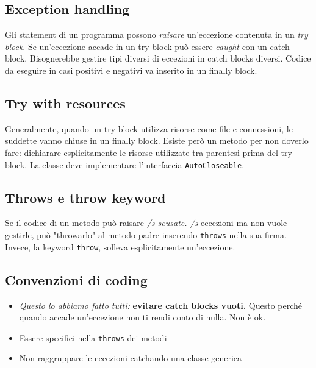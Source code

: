 \documentclass[11pt]{article}
\newcommand{\code}[1]{\texttt{#1}}
\begin{document}
\subsection{Exception handling}
Gli statement di un programma possono \textit{raisare} un'eccezione contenuta in un \textit{try block}. Se un'eccezione accade in un try block può essere \textit{caught} con un catch block. Bisognerebbe gestire tipi diversi di eccezioni in catch blocks diversi. Codice da eseguire in casi positivi e negativi va inserito in un finally block.
\subsection{Try with resources}
Generalmente, quando un try block utilizza risorse come file e connessioni, le suddette vanno chiuse in un finally block. Esiste però un metodo per non doverlo fare: dichiarare esplicitamente le risorse utilizzate tra parentesi prima del try block. La classe deve implementare l'interfaccia \code{AutoCloseable}.
\subsection{Throws e throw keyword}
Se il codice di un metodo può raisare \textit{/s scusate. /s} eccezioni ma non vuole gestirle, può "throwarlo" al metodo padre inserendo \code{throws} nella sua firma. Invece, la keyword \code{throw}, solleva esplicitamente un'eccezione.
\subsection{Convenzioni di coding}
\begin{itemize}
    \item \textit{Questo lo abbiamo fatto tutti:} \textbf{evitare catch blocks vuoti.} Questo perché quando accade un'eccezione non ti rendi conto di nulla. Non è ok.
    \item Essere specifici nella \code{throws} dei metodi 
    \item Non raggruppare le eccezioni catchando una classe generica
\end{itemize}

\printglossary
\end{document}
